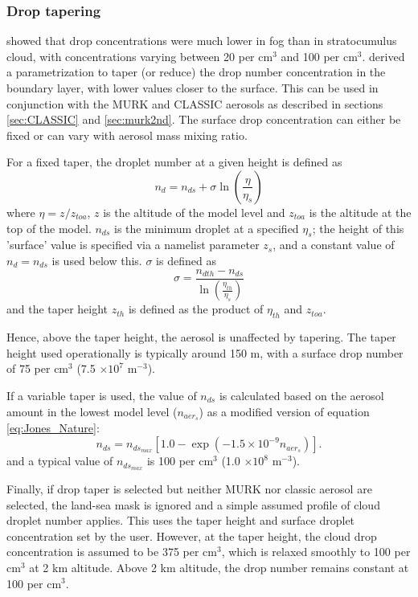 \documentclass{UMDP_article}
\def\bq{\begin{equation}}
\def\eq{\end{equation}}
\begin{document}
\subsubsection{Drop tapering}
\label{sec:drop_taper}
\cite{Price:2011} showed that drop concentrations were much lower in fog than
in stratocumulus cloud, with concentrations varying between 20 per cm$^3$ and
100 per cm$^3$. \cite{Wilkinson:etal:2012} derived a parametrization to taper
(or reduce) the drop number concentration in the boundary layer, with lower
values closer to the surface. This can be used in conjunction with the MURK and
CLASSIC aerosols as described in sections \ref{sec:CLASSIC} and \ref{sec:murk2nd}. 
The surface drop concentration can either be fixed or can vary with aerosol
mass mixing ratio.

For a fixed taper, the droplet number at a given height is defined as  
\bq
\label{eq:taper}
n_d = n_{ds} + \sigma \ln \left( \frac{\eta}{\eta_{s}} \right)  
\eq
where $\eta = z / z_{toa}$, $z$ is the altitude of the model level and $z_{toa}$ is 
the altitude at the top of the model. 
$n_{ds}$ is the minimum droplet at a specified $\eta_{s}$; 
the height of this 'surface' value is specified via a namelist parameter $z_s$, and a constant value of $n_d=n_{ds}$ is used below this.
$\sigma$ is defined as
\bq
\label{eq:sigma}
\sigma = \frac{n_{dth} - n_{ds}}{\ln \left( \frac{\eta_{th}}{\eta_{s}} \right) }
\eq
and the taper height $z_{th}$ is defined as the product of $\eta_{th}$ and $z_{toa}$. 

Hence, above the taper height, the aerosol is unaffected by tapering. The taper
height used operationally is typically around 150 m, with a surface drop number 
of 75 per cm$^3$ (7.5 $\times 10^7$ m$^{-3}$). 

If a variable taper is used, the value of $n_{ds}$ is calculated based on the 
aerosol amount in the lowest model level ($n_{aer_{s}}$) as a modified version of equation 
\ref{eq:Jones_Nature}:
\bq
\label{eq:tapvar}
n_{ds} = n_{ds_{max}} \left[1.0 - \exp \left( - 1.5 \times 10^{-9}  n_{aer_{s}} \right) \right].
\eq
and a typical value of $n_{ds_{max}}$ is 100 per cm$^3$ (1.0 $\times 10^8$ m$^{-3}$). 

Finally, if drop taper is selected but neither MURK nor classic aerosol are selected,
the land-sea mask is ignored and a simple assumed profile of cloud droplet number applies.
This uses the taper height and surface droplet concentration set by the user. However, at
the taper height, the cloud drop concentration is assumed to be 375 per cm$^3$, which is relaxed
smoothly to 100 per cm$^3$ at 2 km altitude. Above 2 km altitude, the drop number remains constant 
at 100 per cm$^3$.
\end{document}
